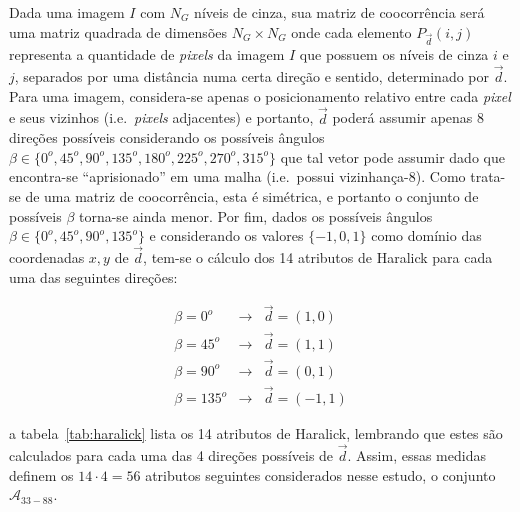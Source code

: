 Dada uma imagem $I$ com $N_G$ níveis de cinza, sua matriz de coocorrência será
uma matriz quadrada de dimensões $N_G \times N_G$ onde cada elemento $P_{\vec{d}}(i,j)$ representa
a quantidade de \textit{pixels} da imagem $I$ que possuem os níveis de cinza $i$ e $j$,
separados por uma distância numa certa direção e sentido, determinado por
$\vec{d}$. Para uma imagem, considera-se apenas o posicionamento relativo entre
cada \textit{pixel} e seus vizinhos (i.e.\ \textit{pixels} adjacentes) e portanto, $\vec{d}$
poderá assumir apenas 8 direções possíveis considerando os possíveis ângulos
$\beta \in \{0^o, 45^o, 90^o, 135^o, 180^o, 225^o, 270^o, 315^o\}$ que tal
vetor pode assumir dado que encontra-se ``aprisionado'' em uma malha
(i.e.\ possui vizinhança-8). Como
trata-se de uma matriz de coocorrência, esta é simétrica, e portanto o
conjunto de possíveis $\beta$ torna-se ainda menor. Por fim, dados os possíveis
ângulos $\beta \in \{0^o, 45^o, 90^o, 135^o\}$ e considerando os valores $\{-1,
0, 1\}$ como domínio das coordenadas $x,y$ de $\vec{d}$, tem-se o cálculo dos 14
atributos de Haralick para cada uma das seguintes direções:

\begin{eqnarray}
  \beta = 0^o & \to & \vec{d} = (1, 0) \\
  \beta = 45^o & \to & \vec{d} = (1, 1) \\
  \beta = 90^o & \to & \vec{d} = (0, 1) \\
  \beta = 135^o & \to & \vec{d} = (-1, 1)
\end{eqnarray}

\noindent a tabela~\ref{tab:haralick} lista os 14 atributos de Haralick,
lembrando que estes são calculados para cada uma das 4 direções possíveis de
$\vec{d}$. Assim, essas medidas definem os $14 \cdot 4 = 56$ atributos seguintes
considerados nesse estudo, o conjunto $\mathcal{A}_{33-88}$.

